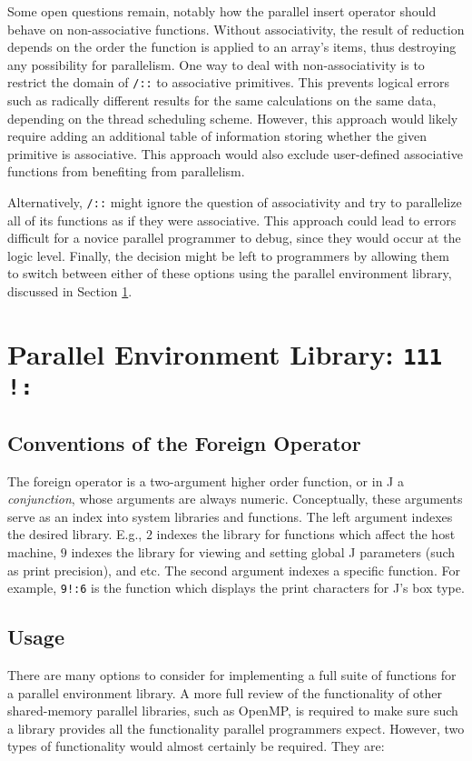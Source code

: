 Some open questions remain, notably 
how the parallel insert operator should behave on non-associative functions. 
Without associativity, the result of reduction depends on the order the function is applied to an array's items, 
thus destroying any possibility for parallelism.
One way to deal with non-associativity is to restrict the domain of \texttt{/::} to associative primitives. 
This prevents logical errors such as radically different results for the same calculations on the same data, 
depending on the thread scheduling scheme. 
However, this approach would likely require adding an additional table of information 
storing whether the given primitive is associative.
This approach would also exclude user-defined associative functions 
from benefiting from parallelism.

Alternatively, \texttt{/::} might ignore the question of associativity 
and try to parallelize all of its functions as if they were associative.
This approach could lead to errors difficult for a novice parallel programmer to debug, 
since they would occur at the logic level. 
Finally, the decision might be left to programmers by allowing them to switch between either of these options 
using the parallel environment library, discussed in Section \ref{pfor}.

\section{Parallel Environment Library: \texttt{111 !:}} 
\label{pfor}

\subsection{Conventions of the Foreign Operator}
The foreign operator is a two-argument higher order function, or in J a \textit{conjunction}, 
whose arguments are always numeric.
Conceptually, these arguments serve as an index into system libraries and functions.
The left argument indexes the desired library.
E.g., $2$ indexes the library for functions which affect the host machine, 
$9$ indexes the library for viewing and setting global J parameters (such as print precision), and etc.
The second argument indexes a specific function.
For example, \texttt{9!:6}  is the function which displays the print characters for J's box type.

\subsection{Usage}
There are many options to consider for implementing a full suite of functions for a parallel environment library.
A more full review of the functionality of other shared-memory parallel libraries, such as OpenMP\cite{openmp}, 
is required to make sure such a library provides all the functionality parallel programmers expect.
However, two types of functionality would almost certainly be required.
They are:

